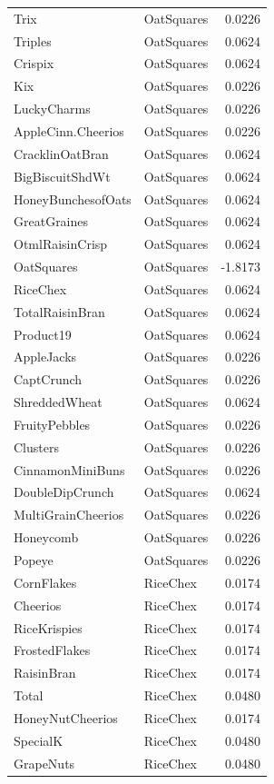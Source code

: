 \begin{longtable}{llr}
Trix & OatSquares & 0.0226 \\
Triples & OatSquares & 0.0624 \\
Crispix & OatSquares & 0.0624 \\
Kix & OatSquares & 0.0226 \\
LuckyCharms & OatSquares & 0.0226 \\
AppleCinn.Cheerios & OatSquares & 0.0226 \\
CracklinOatBran & OatSquares & 0.0624 \\
BigBiscuitShdWt & OatSquares & 0.0624 \\
HoneyBunchesofOats & OatSquares & 0.0624 \\
GreatGraines & OatSquares & 0.0624 \\
OtmlRaisinCrisp & OatSquares & 0.0624 \\
OatSquares & OatSquares & -1.8173 \\
RiceChex & OatSquares & 0.0624 \\
TotalRaisinBran & OatSquares & 0.0624 \\
Product19 & OatSquares & 0.0624 \\
AppleJacks & OatSquares & 0.0226 \\
CaptCrunch & OatSquares & 0.0226 \\
ShreddedWheat & OatSquares & 0.0624 \\
FruityPebbles & OatSquares & 0.0226 \\
Clusters & OatSquares & 0.0226 \\
CinnamonMiniBuns & OatSquares & 0.0226 \\
DoubleDipCrunch & OatSquares & 0.0624 \\
MultiGrainCheerios & OatSquares & 0.0226 \\
Honeycomb & OatSquares & 0.0226 \\
Popeye & OatSquares & 0.0226 \\
CornFlakes & RiceChex & 0.0174 \\
Cheerios & RiceChex & 0.0174 \\
RiceKrispies & RiceChex & 0.0174 \\
FrostedFlakes & RiceChex & 0.0174 \\
RaisinBran & RiceChex & 0.0174 \\
Total & RiceChex & 0.0480 \\
HoneyNutCheerios & RiceChex & 0.0174 \\
SpecialK & RiceChex & 0.0480 \\
GrapeNuts & RiceChex & 0.0480 \\

\end{longtable}
